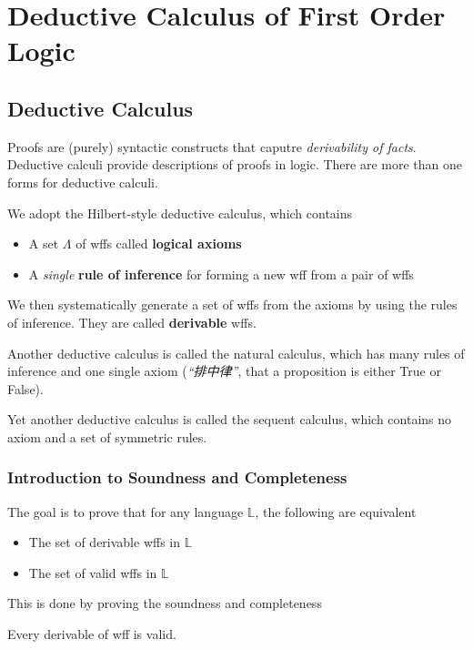 \chapter{Deductive Calculus of First Order Logic}

\section{Deductive Calculus}

Proofs are (purely) syntactic constructs that caputre \emph{derivability of facts}. Deductive calculi provide descriptions of proofs in logic. There are more than one forms for deductive calculi.

We adopt the Hilbert-style deductive calculus, which contains

\begin{itemize}
    \item A set $\Lambda$ of wffs called \textbf{logical axioms}
    \item A \emph{single} \textbf{rule of inference} for forming a new wff from a pair of wffs
\end{itemize}

We then systematically generate a set of wffs from the axioms by using the rules of inference. They are called \textbf{derivable} wffs.

Another deductive calculus is called the natural calculus, which has many rules of inference and one single axiom (\emph{“排中律”}, that a proposition is either True or False).

Yet another deductive calculus is called the sequent calculus, which contains no axiom and a set of symmetric rules.

\subsection{Introduction to Soundness and Completeness}

The goal is to prove that for any language $\mathbb{L}$, the following are equivalent

\begin{itemize}
    \item The set of derivable wffs in $\mathbb{L}$
    \item The set of valid wffs in $\mathbb{L}$
\end{itemize}

This is done by proving the soundness and completeness

\begin{theorem}[Soundness]
    \label{thm:FOSoundness}
    Every derivable of wff is valid.
\end{theorem}

